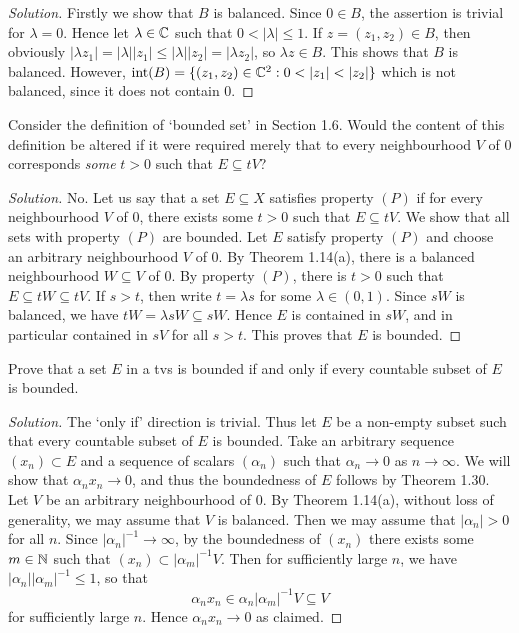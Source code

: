 \begin{proof}[Solution]
	Firstly we show that $B$ is balanced. Since $0 \in B$, the assertion is trivial for $\lambda=0$. Hence let $\lambda \in \mathbb{C}$ such that $0 < |\lambda| \le 1$. If $z = (z_1, z_2) \in B$, then obviously $|\lambda z_1| = |\lambda||z_1| \le |\lambda| |z_2| = |\lambda z_2|$, so $\lambda z \in B$. This shows that $B$ is balanced. However, $\text{int}(B) = \{ (z_1,z_2) \in \CC^2 : 0<|z_1|<|z_2|\}$ which is not balanced, since it does not contain 0.
\end{proof}

\begin{exercise}
	Consider the definition of `bounded set' in Section 1.6. Would the content of this definition be altered if it were required merely that to every neighbourhood $V$ of 0 corresponds \emph{some} $t>0$ such that $E \subseteq tV$?
\end{exercise}

\begin{proof}[Solution]
	No. Let us say that a set $E \subseteq X$ satisfies property $(P)$ if for every neighbourhood $V$ of 0, there exists some $t>0$ such that $E \subseteq tV$. We show that all sets with property $(P)$ are bounded. Let $E$ satisfy property $(P)$ and choose an arbitrary neighbourhood $V$ of 0. By Theorem 1.14(a), there is a balanced neighbourhood $W \subseteq V$ of 0. By property $(P)$, there is $t>0$ such that $E \subseteq tW \subseteq tV$. If $s>t$, then write $t = \lambda s$ for some $\lambda \in (0,1)$. Since $sW$ is balanced, we have $tW = \lambda sW \subseteq sW$. Hence $E$ is contained in $sW$, and in particular contained in $sV$ for all $s>t$. This proves that $E$ is bounded.
\end{proof}

\begin{exercise}
	Prove that a set $E$ in a tvs is bounded if and only if every countable subset of $E$ is bounded.
\end{exercise}

\begin{proof}[Solution]
	The `only if' direction is trivial. Thus let $E$ be a non-empty subset such that every countable subset of $E$ is bounded. Take an arbitrary sequence $(x_n) \subset E$ and a sequence of scalars $(\alpha_n)$ such that $\alpha_n \to 0$ as $n \to \infty$. We will show that $\alpha_n x_n \to 0$, and thus the boundedness of $E$ follows by Theorem 1.30. Let $V$ be an arbitrary neighbourhood of 0. By Theorem 1.14(a), without loss of generality, we may assume that $V$ is balanced. Then we may assume that $|\alpha_n| >0$ for all $n$. Since $|\alpha_n|^{-1} \to \infty$, by the boundedness of $(x_n)$ there exists some $m \in \mathbb{N}$ such that $(x_n) \subset |\alpha_m|^{-1}V$. Then for sufficiently large $n$, we have $|\alpha_n||\alpha_m|^{-1} \le 1$, so that
	\begin{equation*}
		\alpha_n x_n \in \alpha_n |\alpha_m|^{-1}V \subseteq V
	\end{equation*}
	for sufficiently large $n$. Hence $\alpha_n x_n \to 0$ as claimed.
\end{proof}